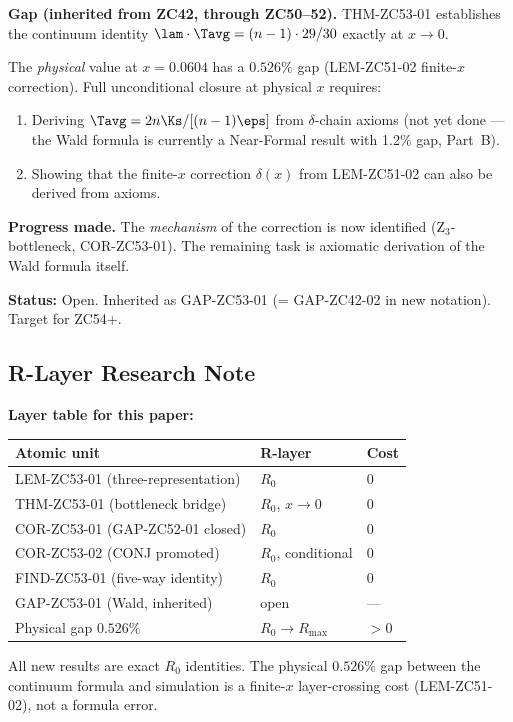 \documentclass[12pt, a4paper]{article}
\begin{document}

\begin{openqbox}[title={GAP-ZC53-01: Wald Residual
  GAP-ZC42-02 (Inherited Open)}]
\textbf{Gap (inherited from ZC42, through ZC50--52).}
THM-ZC53-01 establishes the continuum identity
$\lam\cdot\Tavg = (n-1)\cdot 29/30$ exactly at $x\to 0$.

The \emph{physical} value at $x = 0.0604$ has a $0.526\%$
gap (LEM-ZC51-02 finite-$x$ correction). Full unconditional
closure at physical $x$ requires:
\begin{enumerate}[leftmargin=2em, noitemsep]
\item Deriving $\Tavg = 2n\Ks/[(n-1)\eps]$ from $\delta$-chain
  axioms (not yet done --- the Wald formula is currently
  a Near-Formal result with 1.2\% gap, Part~B).
\item Showing that the finite-$x$ correction $\delta(x)$
  from LEM-ZC51-02 can also be derived from axioms.
\end{enumerate}

\textbf{Progress made.}
The \emph{mechanism} of the correction is now identified
(Z$_3$-bottleneck, COR-ZC53-01). The remaining task is
axiomatic derivation of the Wald formula itself.

\textbf{Status:} Open. Inherited as GAP-ZC53-01
  (= GAP-ZC42-02 in new notation). Target for ZC54+.
\end{openqbox}

\subsection{R-Layer Research Note}

\begin{layerbox}
\textbf{Layer table for this paper:}
\begin{center}
\begin{tabular}{@{}lll@{}}
\toprule
Atomic unit & R-layer & Cost \\
\midrule
LEM-ZC53-01 (three-representation) & $R_0$ & $0$ \\
THM-ZC53-01 (bottleneck bridge) & $R_0$, $x\to 0$ & $0$ \\
COR-ZC53-01 (GAP-ZC52-01 closed) & $R_0$ & $0$ \\
COR-ZC53-02 (CONJ promoted) & $R_0$, conditional & $0$ \\
FIND-ZC53-01 (five-way identity) & $R_0$ & $0$ \\
GAP-ZC53-01 (Wald, inherited) & open & --- \\
\midrule
Physical gap $0.526\%$ & $R_0\to R_{\max}$ & $>0$ \\
\bottomrule
\end{tabular}
\end{center}

All new results are exact $R_0$ identities.
The physical $0.526\%$ gap between the continuum formula
and simulation is a finite-$x$ layer-crossing cost
(LEM-ZC51-02), not a formula error.
\end{layerbox}
\end{document}
